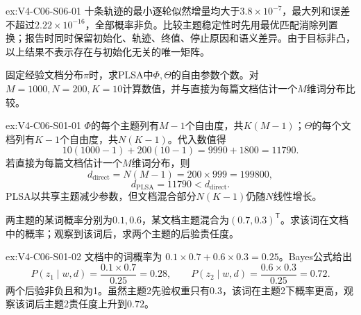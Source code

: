\begin{SLChapterExercisePairSection}
\begin{chapterexercisesolution}{ex:V4-C06-S06-01}
十条轨迹的最小逐轮似然增量均大于$3.8\times10^{-7}$，最大列和误差不超过$2.22\times10^{-16}$，全部概率非负。比较主题稳定性时先用最优匹配消除列置换；报告时同时保留初始化、轨迹、终值、停止原因和语义差异。由于目标非凸，以上结果不表示存在与初始化无关的唯一矩阵。
\end{chapterexercisesolution}
\fi

\SLLectureSupplementExercises

\begin{exercise}\label{ex:V4-C06-S01-01}
固定经验文档分布$\pi$时，求PLSA中$\Phi,\Theta$的自由参数个数。对$M=1000,N=200,K=10$计算数值，并与直接为每篇文档估计一个$M$维词分布比较。
\end{exercise}
\ifSLFullEdition
{}\label{sol:V4-C06-S01-01}
\begin{chapterexercisesolution}{ex:V4-C06-S01-01}
$\Phi$的每个主题列有$M-1$个自由度，共$K(M-1)$；$\Theta$的每个文档列有$K-1$个自由度，共$N(K-1)$。代入数值得
\[
10(1000-1)+200(10-1)=9990+1800=11790.
\]
若直接为每篇文档估计一个$M$维词分布，则
\[
d_{\mathrm{direct}}=N(M-1)=200\times999=199800,
\]
\[
d_{\mathrm{PLSA}}=11790<d_{\mathrm{direct}}.
\]
PLSA以共享主题减少参数，但文档混合部分$N(K-1)$仍随$N$线性增长。
\end{chapterexercisesolution}
\fi

\begin{exercise}\label{ex:V4-C06-S01-02}
两主题的某词概率分别为$0.1,0.6$，某文档主题混合为$(0.7,0.3)^{\mathsf T}$。求该词在文档中的概率；观察到该词后，求两个主题的后验责任度。
\end{exercise}
\ifSLFullEdition
{}\label{sol:V4-C06-S01-02}
\begin{chapterexercisesolution}{ex:V4-C06-S01-02}
文档中的词概率为
$0.1\times0.7+0.6\times0.3=0.25$。Bayes公式给出
\[
P(z_1\mid w,d)=\frac{0.1\times0.7}{0.25}=0.28,
\qquad
P(z_2\mid w,d)=\frac{0.6\times0.3}{0.25}=0.72.
\]
两个后验非负且和为1。虽然主题2先验权重只有$0.3$，该词在主题2下概率更高，观察该词后主题2责任度上升到$0.72$。
\end{chapterexercisesolution}
\fi


\end{SLChapterExercisePairSection}
